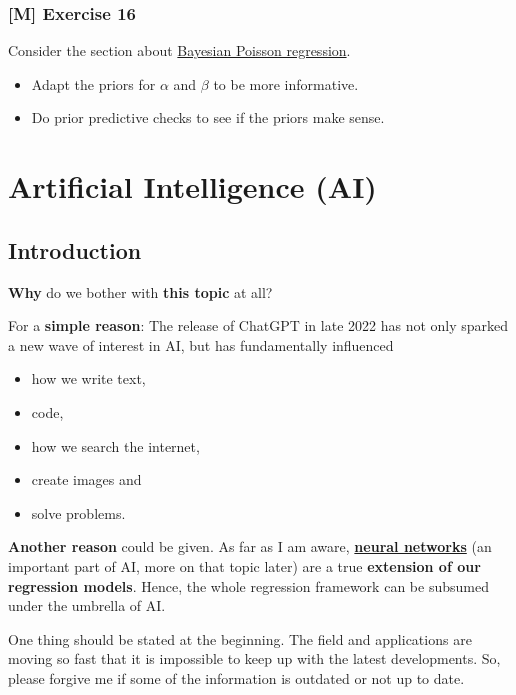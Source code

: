 \documentclass[
]{book}
\providecommand{\tightlist}{%
  \setlength{\itemsep}{0pt}\setlength{\parskip}{0pt}}
\begin{document}
\subsection{{[}M{]} Exercise 16}\label{exercise16_LMM}

Consider the section about \hyperref[bayesian_poisson_regression]{Bayesian Poisson regression}.

\begin{itemize}
\tightlist
\item
  Adapt the priors for \(\alpha\) and \(\beta\) to be more informative.
\item
  Do prior predictive checks to see if the priors make sense.
\end{itemize}

\chapter{Artificial Intelligence (AI)}\label{artificial-intelligence-ai}

\section{Introduction}\label{introduction}

\textbf{Why} do we bother with \textbf{this topic} at all?

For a \textbf{simple reason}: The release of ChatGPT in late 2022
has not only sparked a new wave of interest in AI,
but has fundamentally influenced

\begin{itemize}
\tightlist
\item
  how we write text,
\item
  code,
\item
  how we search the internet,
\item
  create images and
\item
  solve problems.
\end{itemize}

\textbf{Another reason} could be given. As far as I am aware,
\href{https://en.wikipedia.org/wiki/Neural_network_(machine_learning)}{\textbf{neural networks}}
(an important part of AI, more on that topic later) are a
true \textbf{extension of our regression models}.
Hence, the whole regression framework
can be subsumed under the umbrella of AI.

One thing should be stated at the beginning. The field and applications are moving
so fast that it is impossible to keep up with the latest developments.
So, please forgive me if some of the information is outdated or not up to date.
\end{document}
